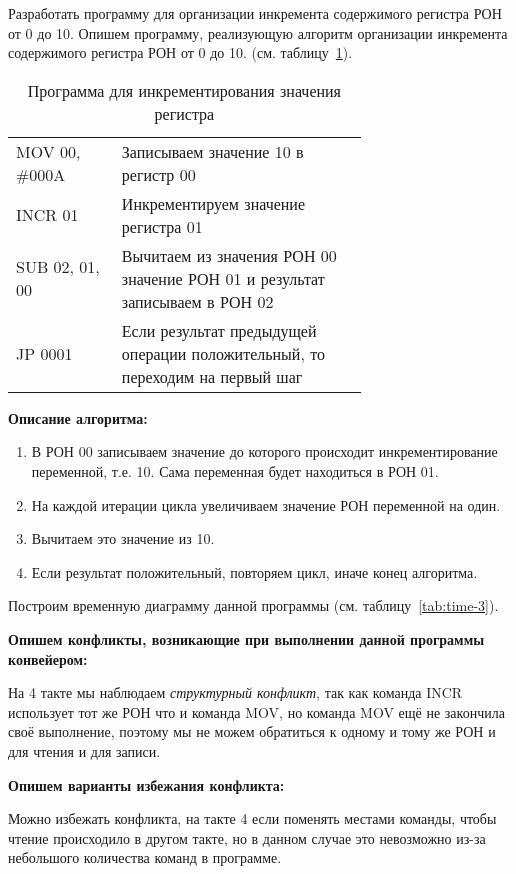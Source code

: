 \documentclass[a4paper,14pt]{extarticle}
\begin{document}
\begin{problem}
	Разработать программу для организации инкремента содержимого
	регистра РОН от 0 до 10.
	\nonum
	Опишем программу, реализующую алгоритм организации инкремента содержимого
	регистра РОН от 0 до 10. (см. таблицу~\ref{tab:prog-3}).	
	
	\begin{table}[htbp]
		\begin{tabular}{|l|p{0.7\linewidth}|}
			\hline
			\centerboldcell{Команда} & \centerboldcell{Описание} \\ \hline\hline
			MOV 00, \#000A & Записываем значение 10 в регистр 00 \\ \hline
			INCR 01 & Инкрементируем значение регистра 01 \\ \hline
			SUB 02, 01, 00 & Вычитаем из значения РОН 00 значение РОН 01 и результат записываем в РОН 02 \\ \hline
			JP 0001 & Если результат предыдущей операции положительный, то переходим на первый шаг \\ \hline
		\end{tabular}
		\caption{Программа для инкрементирования значения регистра}
		\label{tab:prog-3}
	\end{table}

\textbf{Описание алгоритма:}
\begin{enumerate}
	\item В РОН 00 записываем значение до которого происходит инкрементирование переменной, т.е. 10. Сама переменная будет находиться в РОН 01.
	\item На каждой итерации цикла увеличиваем значение РОН переменной на один.
	\item Вычитаем это значение из 10.
	\item Если результат положительный, повторяем цикл, иначе конец алгоритма.
\end{enumerate}

Построим временную диаграмму данной программы (см. таблицу~\ref{tab:time-3}).

\textbf{Опишем конфликты, возникающие при выполнении данной программы конвейером:}

На 4 такте мы наблюдаем\textit{ структурный конфликт}, так как команда INCR использует тот же РОН что и команда MOV, но команда MOV ещё не закончила своё выполнение, поэтому мы  не можем обратиться к одному и тому же РОН и для чтения и для записи.

\textbf{Опишем варианты избежания конфликта:}

 Можно избежать конфликта, на такте 4 если поменять местами команды, чтобы чтение происходило в другом такте, но в данном случае это невозможно из-за небольшого количества команд в программе.

\end{problem}	
\end{document}
